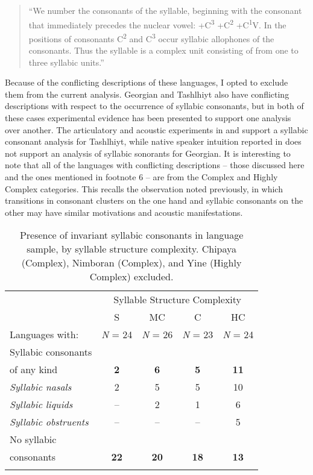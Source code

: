 \begin{quote}
“We number the consonants of the syllable, beginning with the consonant that immediately precedes the nuclear vowel: +C\textsuperscript{3} +C\textsuperscript{2} +C\textsuperscript{1}V. In the positions of consonants C\textsuperscript{2} and C\textsuperscript{3} occur syllabic allophones of the consonants. Thus the syllable is a complex unit consisting of from one to three syllabic units.” 
\citep[23]{Matteson1965}
\end{quote}

Because of the conflicting descriptions of these languages, I opted to exclude them from the current analysis. Georgian and Tashlhiyt also have conflicting descriptions with respect to the occurrence of syllabic consonants, but in both of these cases experimental evidence has been presented to support one analysis over another. The articulatory and acoustic experiments in \citet{Ridouane2008} and \citet{GoldsteinEtAl2007} support a syllabic consonant analysis for Tashlhiyt, while native speaker intuition reported in \citet{Chitoran1999} does not support an analysis of syllabic sonorants for Georgian. It is interesting to note that all of the languages with conflicting descriptions -- those discussed here and the ones mentioned in footnote 6 -- are from the Complex and Highly Complex categories. This recalls the observation noted previously, in which transitions in consonant clusters on the one hand and syllabic consonants on the other may have similar motivations and acoustic manifestations.

\begin{table}
\begin{tabular}{lcccc}
\lsptoprule
 & \multicolumn{4}{c}{Syllable Structure Complexity}\\\cmidrule(lr){2-5}
                        & S & MC & C & HC\\
  Languages with:       &  \textit{N} = 24   & \textit{N} = 26                & \textit{N} = 23     & \textit{N} = 24\\\midrule

 Syllabic consonants\\
   of any kind                         & \textbf{2} & \textbf{6} & \textbf{5} & \textbf{11}\\
 \textit{Syllabic nasals} & 2 & 5 & 5 & 10\\
 \textit{Syllabic liquids} & -- & 2 & 1 & 6\\
 \textit{Syllabic obstruents} & -- & -- & -- & 5\\
 No syllabic\\
    consonants            & \textbf{22} & \textbf{20} & \textbf{18} & \textbf{13}\\
\lspbottomrule
\end{tabular}
\caption{\label{tab:3.6}Presence of invariant syllabic consonants in language sample, by syllable structure complexity. Chipaya (Complex), Nimboran (Complex), and Yine (Highly Complex) excluded.}
\end{table}

